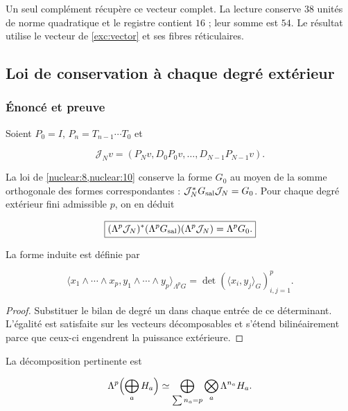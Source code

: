 Un seul complément récupère ce vecteur complet.
La lecture conserve \(38\) unités de norme quadratique et le
registre contient \(16\) ; leur somme est \(54\).
Le résultat utilise le vecteur de \eqref{exc:vector} et ses fibres
réticulaires.


\subsection{Loi de conservation à chaque degré extérieur}

\subsubsection{Énoncé et preuve}

Soient \(P_0=I\), \(P_n=T_{n-1}\cdots T_0\) et




\[
\mathcal J_Nv=(P_Nv,D_0P_0v,\ldots,D_{N-1}P_{N-1}v).
\]



La loi de \cref{nuclear:8,nuclear:10} conserve la forme \(G_0\)
au moyen de la somme orthogonale des formes correspondantes :
\(\mathcal J_N^*G_{\rm sal}\mathcal J_N=G_0\).
Pour chaque degré extérieur fini admissible \(p\), on en déduit



\begin{equation}
\boxed{
(\Lambda^p\mathcal J_N)^*(\Lambda^pG_{\rm sal})
(\Lambda^p\mathcal J_N)=\Lambda^pG_0.
}
\label{nuc11:eq:20}
\end{equation}



La forme induite est définie par



\[
\langle x_1\wedge\cdots\wedge x_p,
y_1\wedge\cdots\wedge y_p\rangle_{\Lambda^pG}
=\det(\langle x_i,y_j\rangle_G)_{i,j=1}^p.
\]



\begin{proof}
Substituer le bilan de degré un dans chaque entrée de ce déterminant. L’égalité est satisfaite sur les vecteurs décomposables et s’étend bilinéairement parce que ceux-ci engendrent la puissance extérieure.

\end{proof}

La décomposition pertinente est



\[
\Lambda^p\Bigl(\bigoplus_aH_a\Bigr)
\simeq\bigoplus_{\sum n_a=p}\bigotimes_a\Lambda^{n_a}H_a.
\]



